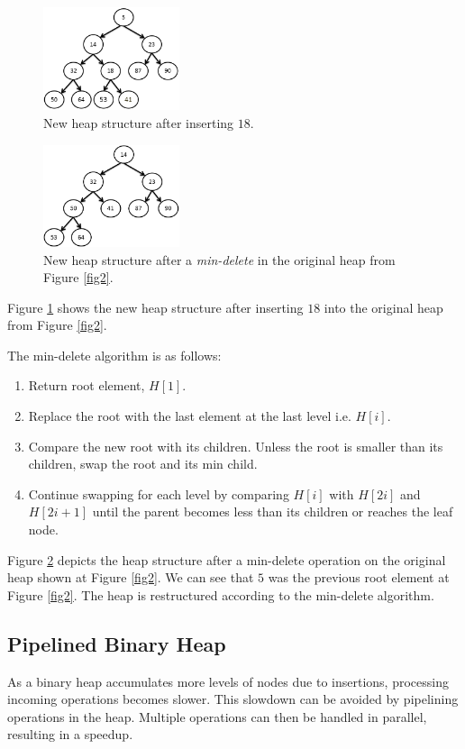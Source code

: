 \begin{figure}[!ht]
  \centering
  \includegraphics[width=4cm]{fig/normal-insert.png}
      \caption{New heap structure after inserting $18$.}
    \label{normal-insert}
\end{figure}

\begin{figure}[!ht]
  \centering
  \includegraphics[width=4cm]{fig/normal-delete.png}
      \caption{New heap structure after a {\it min-delete} in the original heap from Figure \ref{fig2}.}
    \label{normal-delete}
\end{figure}

Figure \ref{normal-insert} shows the new heap structure after inserting $18$ into the original heap from Figure \ref{fig2}.

The min-delete algorithm is as follows:
\begin{enumerate}
\item Return root element, $H[1]$.
\item Replace the root with the last element at the last level i.e. $H[i]$.
\item Compare the new root with its children. Unless the root is smaller than its children, swap the root and its min child.
\item Continue swapping for each level by comparing $H[i]$ with $H[2i]$ and $H[2i+1]$ until the parent becomes less than its children or reaches the leaf node.
\end{enumerate}

Figure \ref{normal-delete} depicts the heap structure after a min-delete operation on the original heap shown at Figure \ref{fig2}.
We can see that $5$ was the previous root element at Figure \ref{fig2}.
The heap is restructured according to the min-delete algorithm.

\subsection{Pipelined Binary Heap}
As a binary heap accumulates more levels of nodes due to insertions, processing incoming operations becomes slower.
This slowdown can be avoided by pipelining operations in the heap.
Multiple operations can then be handled in parallel, resulting in a speedup.

